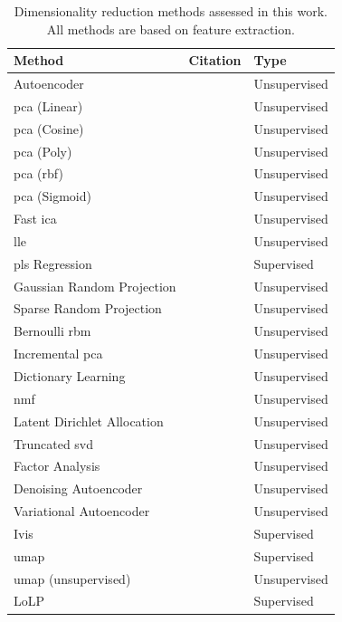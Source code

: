 \begin{table}
\caption[Dimensionality reduction methods]{Dimensionality reduction methods assessed in this work. All methods are based on feature extraction.
    }
\label{tab:ch05:dimensionality reduction-methods}

    \centering


    \small{
    \begin{tabularx}{\textwidth}{@{}>{\raggedright\arraybackslash}Xll@{}}
        \toprule
         Method&  Citation&  Type \\ \midrule
          Autoencoder & \citet{Ballard87} & Unsupervised\\
         \acrshort{pca} (Linear)& \citet{Pearson1901} &  Unsupervised\\
         \acrshort{pca} (Cosine)& \citet{SchEtAl97}  &  Unsupervised\\
         \acrshort{pca} (Poly)& \citet{SchEtAl97}  &  Unsupervised \\
         \acrshort{pca} (\acrshort{rbf})& \citet{SchEtAl97}  &  Unsupervised \\
         \acrshort{pca} (Sigmoid)& \citet{SchEtAl97}  &  Unsupervised \\
         Fast \acrshort{ica}& \citet{HyvOja00} &  Unsupervised \\
         \acrshort{lle}& \citet{RowSau00} &  Unsupervised \\
         \acrshort{pls} Regression& \citet{WolEtAl01} &Supervised \\
         Gaussian Random Projection& \citet{Achlioptas01} & Unsupervised\\
         Sparse Random Projection& \citet{Achlioptas01} & Unsupervised \\
         Bernoulli \acrshort{rbm}& \citet{HinEtAl06} & Unsupervised\\
         Incremental \acrshort{pca}& \citet{RosEtAl08} &  Unsupervised \\
         Dictionary Learning& \citet{MaiEtAl09} & Unsupervised \\
         \acrshort{nmf}& \citet{CicPha09} & Unsupervised\\
         Latent Dirichlet Allocation & \citet{BleEtAl03} & Unsupervised\\

         Truncated \acrshort{svd}& \citet{HalEtAl11} &  Unsupervised\\
         Factor Analysis& \citet{Barber12} & Unsupervised\\
                  Denoising Autoencoder & \citet{BenEtAl13} & Unsupervised\\
         Variational Autoencoder & \citet{KinWel14} & Unsupervised\\
         Ivis& \citet{SzuEtAl19} & Supervised\\
         \acrshort{umap}& \citet{McIEtAl18} & Supervised\\
         \acrshort{umap} (unsupervised)& \citet{McIEtAl18} & Unsupervised\\
         LoLP& \citet{VogEtAl21}& Supervised\\


\end{tabularx}}
\end{table}
